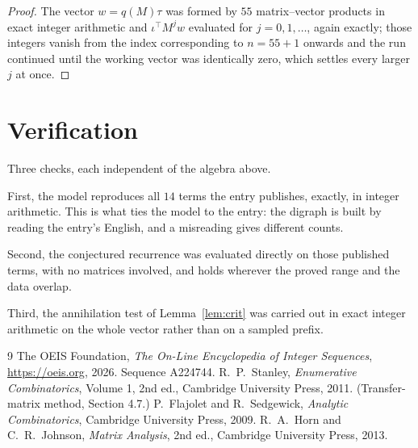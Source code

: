 \documentclass[11pt,a4paper]{article}
\theoremstyle{plain}
\theoremstyle{definition}
\begin{document}
\begin{proof}
The vector $w=q(M)\tau$ was formed by $55$ matrix--vector products in exact integer
arithmetic and $\iota^{\!\top}M^{j}w$ evaluated for $j=0,1,\dots$, again exactly; those
integers vanish from the index corresponding to $n=55+1$ onwards and the run continued
until the working vector was identically zero, which settles every larger $j$ at once.
\end{proof}

\section{Verification}

Three checks, each independent of the algebra above.

First, the model reproduces all $14$ terms the entry publishes, exactly, in integer
arithmetic. This is what ties the model to the entry: the digraph is built by reading the
entry's English, and a misreading gives different counts.

Second, the conjectured recurrence was evaluated directly on those published terms, with no
matrices involved, and holds wherever the proved range and the data overlap.

Third, the annihilation test of Lemma~\ref{lem:crit} was carried out in exact integer
arithmetic on the whole vector rather than on a sampled prefix.

\begin{thebibliography}{9}
 The OEIS Foundation, \emph{The On-Line Encyclopedia of Integer
Sequences}, \url{https://oeis.org}, 2026. Sequence A224744.
 R.~P.~Stanley, \emph{Enumerative Combinatorics}, Volume 1, 2nd ed.,
Cambridge University Press, 2011. (Transfer-matrix method, Section 4.7.)
 P.~Flajolet and R.~Sedgewick, \emph{Analytic Combinatorics}, Cambridge
University Press, 2009.
 R.~A.~Horn and C.~R.~Johnson, \emph{Matrix Analysis}, 2nd ed., Cambridge
University Press, 2013.
\end{thebibliography}
\end{document}
